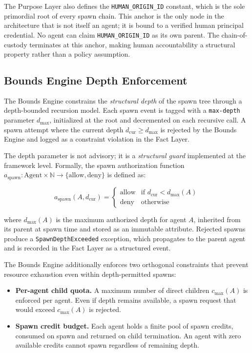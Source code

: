 The Purpose Layer also defines the \texttt{HUMAN\_ORIGIN\_ID} constant, which is the sole primordial root of every spawn chain. This anchor is the only node in the architecture that is not itself an agent; it is bound to a verified human principal credential. No agent can claim \texttt{HUMAN\_ORIGIN\_ID} as its own parent. The chain-of-custody terminates at this anchor, making human accountability a structural property rather than a policy assumption.

\subsection{Bounds Engine Depth Enforcement}
\label{subsection:bounds-engine-depth-enforcement}

The Bounds Engine constrains the \textit{structural depth} of the spawn tree through a depth-bounded recursion model. Each spawn event is tagged with a \texttt{max-depth} parameter $d_{\max}$, initialized at the root and decremented on each recursive call. A spawn attempt where the current depth $d_{\text{cur}} \geq d_{\max}$ is rejected by the Bounds Engine and logged as a constraint violation in the Fact Layer.

The depth parameter is not advisory; it is a \textit{structural guard} implemented at the framework level. Formally, the spawn authorization function $a_{\text{spawn}}: \text{Agent} \times \mathbb{N} \rightarrow \{\text{allow}, \text{deny}\}$ is defined as:

\begin{equation}
a_{\text{spawn}}(A, d_{\text{cur}}) =
\begin{cases}
\text{allow} & \text{if } d_{\text{cur}} < d_{\max}(A) \\
\text{deny} & \text{otherwise}
\end{cases}
\end{equation}

where $d_{\max}(A)$ is the maximum authorized depth for agent $A$, inherited from its parent at spawn time and stored as an immutable attribute. Rejected spawns produce a \texttt{SpawnDepthExceeded} exception, which propagates to the parent agent and is recorded in the Fact Layer as a structured event.

The Bounds Engine additionally enforces two orthogonal constraints that prevent resource exhaustion even within depth-permitted spawns:

\begin{itemize}
    \item \textbf{Per-agent child quota.} A maximum number of direct children $c_{\max}(A)$ is enforced per agent. Even if depth remains available, a spawn request that would exceed $c_{\max}(A)$ is rejected.
    \item \textbf{Spawn credit budget.} Each agent holds a finite pool of spawn credits, consumed on spawn and returned on child termination. An agent with zero available credits cannot spawn regardless of remaining depth.
\end{itemize}

